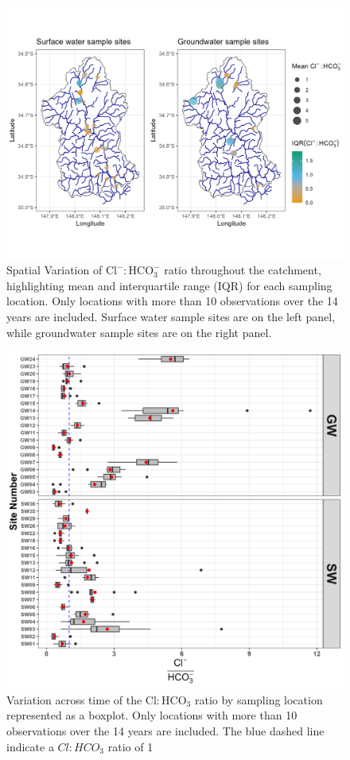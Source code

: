 \documentclass[, manuscript]{copernicus}
\begin{document}
\clearpage

\begin{figure}
\includegraphics[width=0.8\linewidth]{Figures/clhco3_map} \caption{Spatial Variation of $\mathrm{Cl^-:HCO_3^-}$ ratio throughout the catchment, highlighting mean and interquartile range (IQR) for each sampling location. Only locations with more than 10 observations over the 14 years are included. Surface water sample sites are on the left panel, while groundwater sample sites are on the right panel.}\label{fig:Carbonate-map}
\end{figure}

\clearpage

\begin{figure}
\includegraphics[width=0.8\linewidth]{Figures/clhco3_plot} \caption{Variation across time of the $\mathrm{Cl:HCO_3}$ ratio by sampling location represented as a boxplot. Only locations with more than 10 observations over the 14 years are included. The blue dashed line indicate a $Cl:HCO_3$ ratio of 1}\label{fig:Carbonate-boxplot}
\end{figure}
\end{document}
